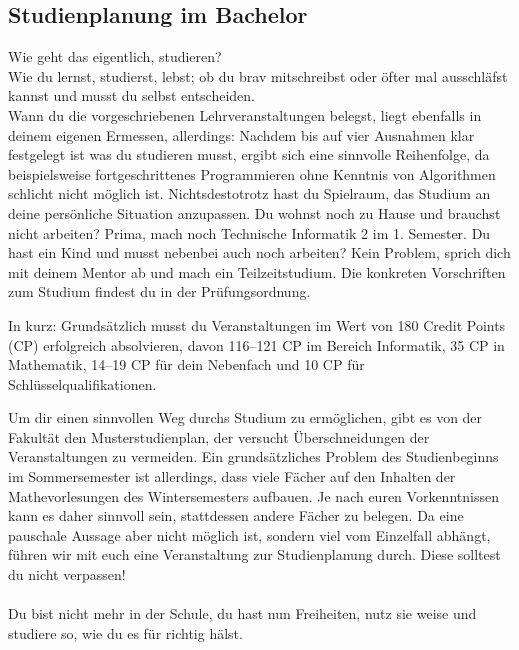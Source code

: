 \subsection{Studienplanung im Bachelor}

Wie geht das eigentlich, studieren?\\
Wie du lernst, studierst, lebst; ob du brav mitschreibst oder öfter mal ausschläfst kannst und musst du selbst entscheiden. \\
Wann du die vorgeschriebenen Lehrveranstaltungen belegst, liegt ebenfalls in deinem eigenen Ermessen, allerdings: Nachdem bis auf vier Ausnahmen klar festgelegt ist was du studieren musst, ergibt sich eine sinnvolle Reihenfolge, da beispielsweise fortgeschrittenes Programmieren ohne Kenntnis von Algorithmen schlicht nicht möglich ist. Nichtsdestotrotz hast du Spielraum, das Studium an deine persönliche Situation anzupassen.
Du wohnst noch zu Hause und brauchst nicht arbeiten? Prima, mach noch Technische Informatik 2 im 1. Semester. Du hast ein Kind und musst nebenbei auch noch arbeiten? Kein Problem, sprich dich mit deinem Mentor ab und mach ein Teilzeitstudium. Die konkreten Vorschriften zum Studium findest du in der Prüfungsordnung.

In kurz: Grundsätzlich musst du Veranstaltungen im Wert von 180 Credit Points (CP) erfolgreich absolvieren, davon 116–121 CP im Bereich Informatik, 35 CP in Mathematik, 14–19 CP für dein Nebenfach und 10 CP für Schlüsselqualifikationen.

Um dir einen sinnvollen Weg durchs Studium zu ermöglichen, gibt es von der Fakultät den Musterstudienplan, der versucht Überschneidungen der Veranstaltungen zu vermeiden. Ein grundsätzliches Problem des Studienbeginns im Sommersemester ist allerdings, dass viele Fächer auf den Inhalten der Mathevorlesungen des Wintersemesters aufbauen. Je nach euren Vorkenntnissen kann es daher sinnvoll sein, stattdessen andere Fächer zu belegen. Da eine pauschale Aussage aber nicht möglich ist, sondern viel vom Einzelfall abhängt, führen wir mit euch eine Veranstaltung zur Studienplanung durch. Diese solltest du nicht verpassen!\\\\
Du bist  nicht mehr in der Schule, du hast nun Freiheiten, nutz sie weise und studiere so, wie du es für richtig hälst. 

